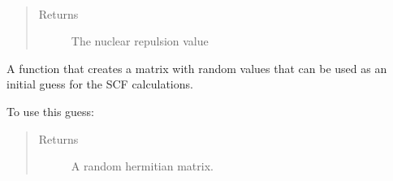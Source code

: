 \documentclass[letterpaper,10pt,english]{sphinxmanual}
\begin{document}
\begin{fulllineitems}
\begin{fulllineitems}
\end{fulllineitems}


\begin{fulllineitems}
\label{\detokenize{Real_GHF:ghf.real_GHF.RealGHF.nuc_rep}}~\begin{quote}\begin{description}
\item[{Returns}] \leavevmode
The nuclear repulsion value

\end{description}\end{quote}

\end{fulllineitems}


\begin{fulllineitems}
\label{\detokenize{Real_GHF:ghf.real_GHF.RealGHF.random_guess}}
A function that creates a matrix with random values that can be used as an initial guess
for the SCF calculations.

To use this guess:

\begin{sphinxVerbatim}[commandchars=\\\{\}]
          
   
  
\end{sphinxVerbatim}
\begin{quote}\begin{description}
\item[{Returns}] \leavevmode
A random hermitian matrix.


\end{description}
\end{quote}
\end{fulllineitems}
\end{fulllineitems}
\end{document}

